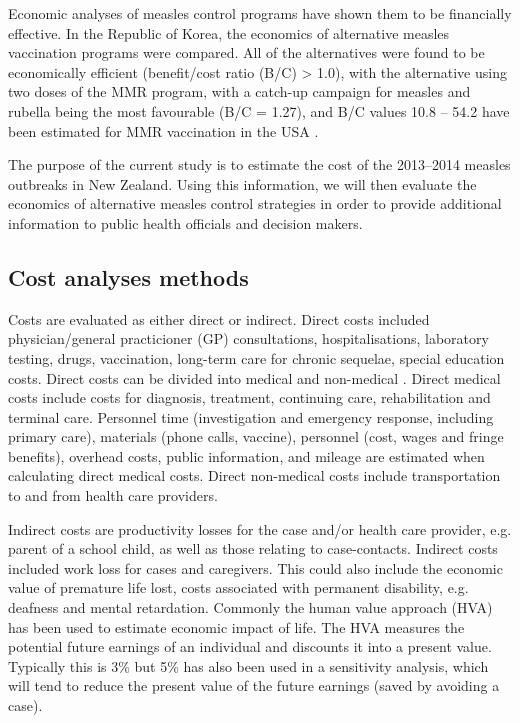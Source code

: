 \documentclass{article}
\begin{document}
Economic analyses of measles control programs have shown them to be financially effective. In the Republic of Korea, the economics of alternative measles vaccination programs were compared. All of the alternatives were found to be economically efficient (benefit/cost ratio (B/C) > 1.0), with the alternative using two doses of the MMR program, with a catch-up campaign for measles and rubella being the most favourable (B/C = 1.27), and B/C values 10.8 -- 54.2 have been estimated for MMR vaccination in the USA \citep{zhou4}.

The purpose of the current study is to estimate the cost of the 2013--2014 measles outbreaks in New Zealand. Using this information, we will then evaluate the economics of alternative measles control strategies in order to provide additional information to public health officials and decision makers.

\subsection{Cost analyses methods}
\label{sub:cost}

Costs are evaluated as either direct or indirect. Direct costs included physician/general practicioner (GP) consultations, hospitalisations, laboratory testing, drugs, vaccination, long-term care for chronic sequelae, special education costs. Direct costs can be divided into medical and non-medical \citep{saha13}. Direct medical costs include costs for diagnosis, treatment, continuing care, rehabilitation and terminal care. Personnel time (investigation and emergency response, including primary care), materials (phone calls, vaccine), personnel (cost, wages and fringe benefits), overhead costs, public information, and mileage are estimated when calculating direct medical costs. Direct non-medical costs include transportation to and from health care providers.

Indirect costs are productivity losses for the case and/or health care provider, e.g. parent of a school child, as well as those relating to case-contacts. Indirect costs included work loss for cases and caregivers. This could also include the economic value of premature life lost, costs associated with permanent disability, e.g. deafness and mental retardation. Commonly the human value approach (HVA) has been used to estimate economic impact of life. The HVA measures the potential future earnings of an individual and discounts it into a present value. Typically this is 3\% but 5\% has also been used in a sensitivity analysis, which will tend to reduce the present value of the future earnings (saved by avoiding a case).
\end{document}
